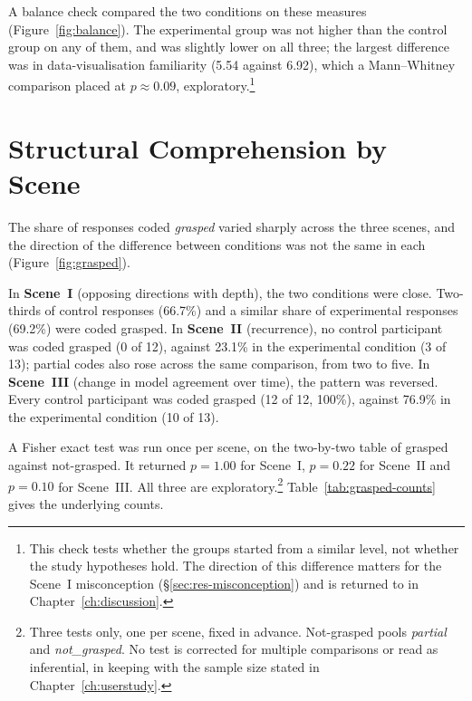 A balance check compared the two conditions on these measures (Figure~\ref{fig:balance}). The experimental group was not higher than the control group on any of them, and was slightly lower on all three; the largest difference was in data-visualisation familiarity (5.54 against 6.92), which a Mann--Whitney comparison placed at $p \approx 0.09$, exploratory.\footnote{This check tests whether the groups started from a similar level, not whether the study hypotheses hold. The direction of this difference matters for the Scene~I misconception (\S\ref{sec:res-misconception}) and is returned to in Chapter~\ref{ch:discussion}.}

\section{Structural Comprehension by Scene}
\label{sec:res-structure}

The share of responses coded \emph{grasped} varied sharply across the three scenes, and the direction of the difference between conditions was not the same in each (Figure~\ref{fig:grasped}).

In \textbf{Scene~I} (opposing directions with depth), the two conditions were close. Two-thirds of control responses (66.7\%) and a similar share of experimental responses (69.2\%) were coded grasped. In \textbf{Scene~II} (recurrence), no control participant was coded grasped (0 of 12), against 23.1\% in the experimental condition (3 of 13); partial codes also rose across the same comparison, from two to five. In \textbf{Scene~III} (change in model agreement over time), the pattern was reversed. Every control participant was coded grasped (12 of 12, 100\%), against 76.9\% in the experimental condition (10 of 13).

A Fisher exact test was run once per scene, on the two-by-two table of grasped against not-grasped. It returned $p = 1.00$ for Scene~I, $p = 0.22$ for Scene~II and $p = 0.10$ for Scene~III. All three are exploratory.\footnote{Three tests only, one per scene, fixed in advance. Not-grasped pools \emph{partial} and \emph{not\_grasped}. No test is corrected for multiple comparisons or read as inferential, in keeping with the sample size stated in Chapter~\ref{ch:userstudy}.} Table~\ref{tab:grasped-counts} gives the underlying counts.

